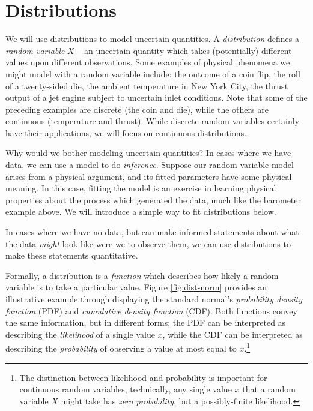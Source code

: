 \documentclass[../primer.tex]{subfiles}
\begin{document}
\section{Distributions}
We will use distributions to model uncertain quantities. A \emph{distribution}
defines a \emph{random variable} $X$ -- an uncertain quantity which takes
(potentially) different values upon different observations. Some examples of
physical phenomena we might model with a random variable include: the outcome of
a coin flip, the roll of a twenty-sided die, the ambient temperature in New York
City, the thrust output of a jet engine subject to uncertain inlet conditions.
Note that some of the preceding examples are discrete (the coin and die), while
the others are continuous (temperature and thrust). While discrete random
variables certainly have their applications, we will focus on continuous
distributions.

Why would we bother modeling uncertain quantities? In cases where we have data,
we can use a model to do \emph{inference}. Suppose our random variable model
arises from a physical argument, and its fitted parameters have some physical
meaning. In this case, fitting the model is an exercise in learning physical
properties about the process which generated the data, much like the barometer
example above. We will introduce a simple way to fit distributions below.

In cases where we have no data, but can make informed statements about what the
data \emph{might} look like were we to observe them, we can use distributions to
make these statements quantitative.

Formally, a distribution is a \emph{function} which describes how likely a
random variable is to take a particular value. Figure \ref{fig:dist-norm}
provides an illustrative example through displaying the standard normal's
\emph{probability density function} (PDF) and \emph{cumulative density function}
(CDF). Both functions convey the same information, but in different forms; the
PDF can be interpreted as describing the \emph{likelihood} of a single value
$x$, while the CDF can be interpreted as describing the \emph{probability} of
observing a value at most equal to $x$.\footnote{The distinction between
  likelihood and probability is important for continuous random variables;
  technically, any single value $x$ that a random variable $X$ might take has
  \emph{zero probability}, but a possibly-finite likelihood.}
\end{document}

